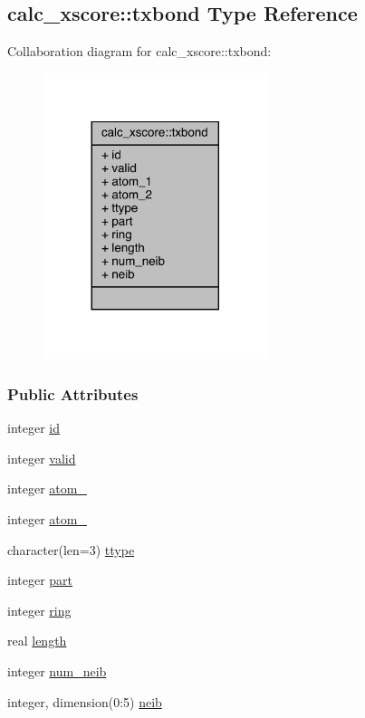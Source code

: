 \hypertarget{structcalc__xscore_1_1txbond}{\subsection{calc\-\_\-xscore\-:\-:txbond Type Reference}
\label{structcalc__xscore_1_1txbond}
}


Collaboration diagram for calc\-\_\-xscore\-:\-:txbond\-:
\nopagebreak
\begin{figure}[H]
\begin{center}
\leavevmode
\includegraphics[width=185pt]{structcalc__xscore_1_1txbond__coll__graph}
\end{center}
\end{figure}
\subsubsection*{Public Attributes}
\begin{DoxyCompactItemize}
\item 
integer \hyperlink{structcalc__xscore_1_1txbond_abb70954c3e520828dcc6af12c952f654}{id}
\item 
integer \hyperlink{structcalc__xscore_1_1txbond_a3cea2cd9a29a709b6ce87083479f5fe1}{valid}
\item 
integer \hyperlink{structcalc__xscore_1_1txbond_abce26fa72f5d430ce6d2c56f9980aaf5}{atom\-\_}
\item 
integer \hyperlink{structcalc__xscore_1_1txbond_aadabb5620a8b76bbf5620029147a06b9}{atom\-\_}
\item 
character(len=3) \hyperlink{structcalc__xscore_1_1txbond_a84d8fad8b1e0570b1f65f79fcd26e39e}{ttype}
\item 
integer \hyperlink{structcalc__xscore_1_1txbond_ac373cd12c516bf47737dda668f588160}{part}
\item 
integer \hyperlink{structcalc__xscore_1_1txbond_a7e9a632c5e5c0726a62ff37c34fd256c}{ring}
\item 
real \hyperlink{structcalc__xscore_1_1txbond_a678cee363bebc379d18806416b3f7d35}{length}
\item 
integer \hyperlink{structcalc__xscore_1_1txbond_a7632802a73be1444be846a8aa93e4ce5}{num\-\_\-neib}
\item 
integer, dimension(0\-:5) \hyperlink{structcalc__xscore_1_1txbond_a97b686f796222bc93e255dc53cd10ff2}{neib}
\end{DoxyCompactItemize}


